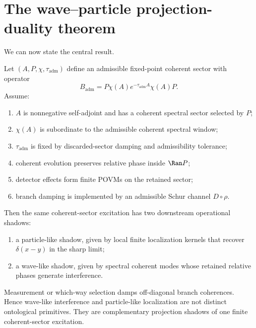 \documentclass[11pt]{article}
\newcommand{\Badm}{B_{\mathrm{adm}}}
\newcommand{\ta}{\tau_{\mathrm{adm}}}
\begin{document}
\section{The wave--particle projection-duality theorem}

We can now state the central result.

\begin{theorem}
\label{thm:projection-duality}
Let \((A,P,\chi,\ta)\) define an admissible fixed-point coherent sector with operator
\[
  \Badm=P\chi(A)e^{-\ta A}\chi(A)P.
\]
Assume:
\begin{enumerate}[label=(\roman*)]
  \item \(A\) is nonnegative self-adjoint and has a coherent spectral sector selected by \(P\);
  \item \(\chi(A)\) is subordinate to the admissible coherent spectral window;
  \item \(\ta\) is fixed by discarded-sector damping and admissibility tolerance;
  \item coherent evolution preserves relative phase inside \(\Ran P\);
  \item detector effects form finite POVMs on the retained sector;
  \item branch damping is implemented by an admissible Schur channel \(D\circ\rho\).
\end{enumerate}
Then the same coherent-sector excitation has two downstream operational shadows:
\begin{enumerate}[label=(\alph*)]
  \item a particle-like shadow, given by local finite localization kernels that recover
  \(\delta(x-y)\) in the sharp limit;
  \item a wave-like shadow, given by spectral coherent modes whose retained relative phases
  generate interference.
\end{enumerate}
Measurement or which-way selection damps off-diagonal branch coherences. Hence
wave-like interference and particle-like localization are not distinct ontological primitives.
They are complementary projection shadows of one finite coherent-sector excitation.
\end{theorem}
\end{document}
